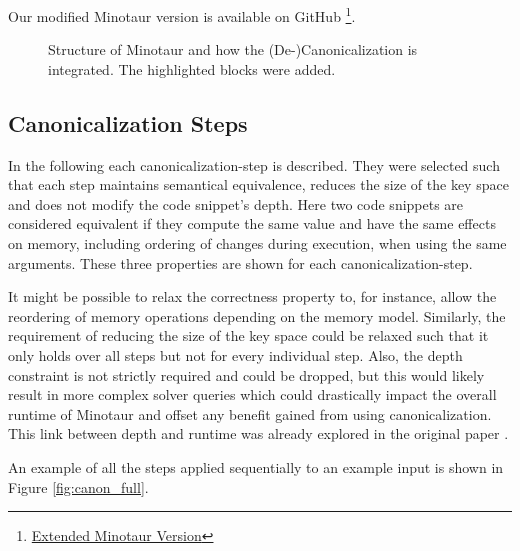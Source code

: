 	Our modified Minotaur version is available on GitHub \footnote{\href{https://github.com/KiSchulz/minotaur}{Extended Minotaur Version}}.

	\begin{figure}[t]
		\begin{center}
			\caption{\label{fig:architecture} Structure of Minotaur and how the (De-)Canonicalization is integrated. The highlighted blocks were added.}
			
		\end{center}
	\end{figure}

	\subsection{Canonicalization Steps \label{sec:steps}}
	In the following each canonicalization-step is described.
	They were selected such that each step maintains semantical equivalence, reduces the size of the key space and does not modify the code snippet's depth.
	Here two code snippets are considered equivalent if they compute the same value and have the same effects on memory, including ordering of changes during execution, when using the same arguments.
	These three properties are shown for each canonicalization-step.

	It might be possible to relax the correctness property to, for instance, allow the reordering of memory operations depending on the memory model.
	Similarly, the requirement of reducing the size of the key space could be relaxed such that it only holds over all steps but not for every individual step.
	Also, the depth constraint is not strictly required and could be dropped, but this would likely result in more complex  solver queries which could drastically impact the overall runtime of Minotaur and offset any benefit gained from using canonicalization.
	This link between depth and runtime was already explored in the original paper \cite{liu24:minotaur}.
	
	An example of all the steps applied sequentially to an example input is shown in Figure \ref{fig:canon_full}.

